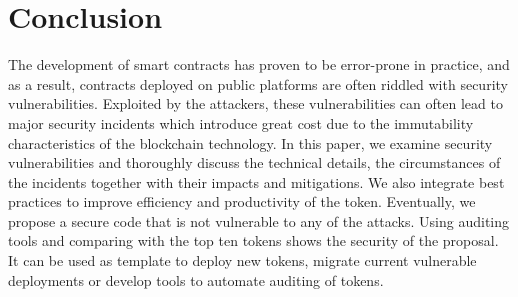 
\section{Conclusion}

The development of smart contracts has proven to be error-prone in practice, and as a result, contracts deployed on public platforms are often riddled with security vulnerabilities. Exploited by the attackers, these vulnerabilities can often lead to major security incidents which introduce great cost due to the immutability characteristics of the blockchain technology. In this paper, we examine \erc security vulnerabilities and thoroughly discuss the technical details, the circumstances of the incidents together with their impacts and mitigations. We also integrate best practices to improve efficiency and productivity of the token. Eventually, we propose a secure \erc code that is not vulnerable to any of the attacks. Using auditing tools and comparing with the top ten \erc tokens shows the security of the proposal. It can be used as template to deploy new \erc tokens, migrate current vulnerable deployments or develop tools to automate auditing of \erc tokens.



